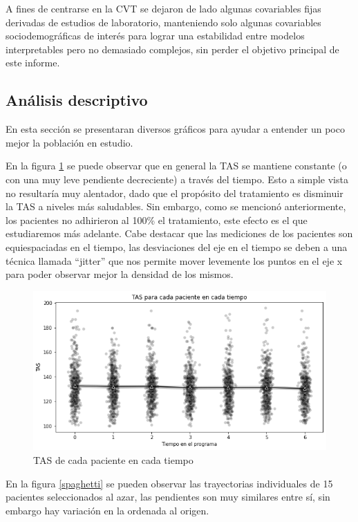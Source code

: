 \documentclass[spanish]{article}
\numberwithin{figure}{subsection}
\numberwithin{equation}{subsection}
\numberwithin{table}{subsection}
\begin{document}
A fines de centrarse en la CVT se dejaron de lado algunas covariables fijas
derivadas de estudios de laboratorio, manteniendo solo algunas covariables
sociodemográficas de interés para lograr una estabilidad entre modelos
interpretables pero no demasiado complejos, sin perder el objetivo principal de
este informe.

\subsection{Análisis descriptivo}

En esta sección se presentaran diversos gráficos para ayudar a entender un poco
mejor la población en estudio.

En la figura \ref{TAS_vs_tpo} se puede observar que en general la TAS se
mantiene constante (o con una muy leve pendiente decreciente) a través del
tiempo. Esto a simple vista no resultaría muy alentador, dado que el propósito
del tratamiento es disminuir la TAS a niveles más saludables. Sin embargo, como
se mencionó anteriormente, los pacientes no adhirieron al 100\% el tratamiento,
este efecto es el que estudiaremos más adelante. Cabe destacar que las
mediciones de los pacientes son equiespaciadas en el tiempo, las desviaciones
del eje en el tiempo se deben a una técnica llamada ``jitter'' que nos permite
mover levemente los puntos en el eje x para poder observar mejor la densidad de
los mismos. 

\begin{figure}[H]
	\centering
	\includegraphics[scale=0.5]{img/TAS_vs_tpo.png}
	\caption{TAS de cada paciente en cada tiempo}
	\label{TAS_vs_tpo}
\end{figure}

En la figura \ref{spaghetti} se pueden observar las trayectorias individuales
de 15 pacientes seleccionados al azar, las pendientes son muy similares entre
sí, sin embargo hay variación en la ordenada al origen.
\end{document}
